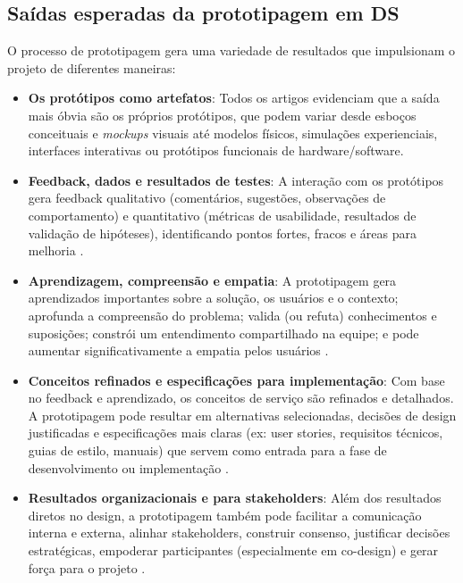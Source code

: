 \subsection{Saídas esperadas da prototipagem em DS}

O processo de prototipagem gera uma variedade de resultados que impulsionam o projeto de diferentes maneiras:

\begin{itemize}
	\item \textbf{Os protótipos como artefatos}: Todos os artigos evidenciam que a saída mais óbvia são os próprios protótipos, que podem variar desde esboços conceituais e \textit{mockups} visuais até modelos físicos, simulações experienciais, interfaces interativas ou protótipos funcionais de hardware/software.
	
	\item \textbf{Feedback, dados e resultados de testes}: A interação com os protótipos gera feedback qualitativo (comentários, sugestões, observações de comportamento) e quantitativo (métricas de usabilidade, resultados de validação de hipóteses), identificando pontos fortes, fracos e áreas para melhoria \cite{hegemann2024palette, iriarte2023service, paust2025integrative, asbjornsen2022echange, giraldo2024ecotourism, kumar2023rheumatology, lee2023industry, seko2024transitions, villa2022integratedcare}.
	
	\item \textbf{Aprendizagem, compreensão e empatia}: A prototipagem gera aprendizados importantes sobre a solução, os usuários e o contexto; aprofunda a compreensão do problema; valida (ou refuta) conhecimentos e suposições; constrói um entendimento compartilhado na equipe; e pode aumentar significativamente a empatia pelos usuários \cite{hegemann2024palette, quintero2021interdisciplinary, mager2023product, paust2025integrative, you2022applying, soto2023prototyping, lambe2022capabilities}.
	
	\item \textbf{Conceitos refinados e especificações para implementação}: Com base no feedback e aprendizado, os conceitos de serviço são refinados e detalhados. A prototipagem pode resultar em alternativas selecionadas, decisões de design justificadas e especificações mais claras (ex: user stories, requisitos técnicos, guias de estilo, manuais) que servem como entrada para a fase de desenvolvimento ou implementação \cite{hegemann2024palette, iriarte2023service, nguyen2022human, Vieira2025, schlott2024design, asbjornsen2022echange, milton2021eatingdisorders, villa2022integratedcare, Suryawati2024}.
	
	\item \textbf{Resultados organizacionais e para stakeholders}: Além dos resultados diretos no design, a prototipagem também pode facilitar a comunicação interna e externa, alinhar stakeholders, construir consenso, justificar decisões estratégicas, empoderar participantes (especialmente em co-design) e gerar força para o projeto \cite{quintero2021interdisciplinary, iriarte2023service, mager2023product, paust2025integrative, lambe2022capabilities}.
\end{itemize}

